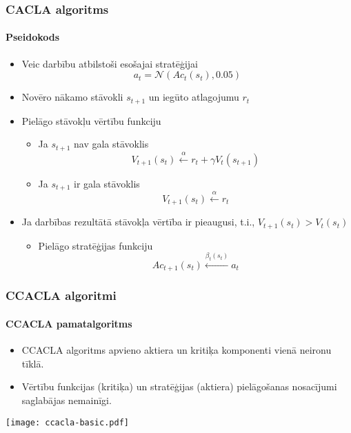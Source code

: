 \documentclass[xetex,mathserif]{beamer}
\begin{document}
  \begin{frame}
    \frametitle{CACLA algoritms}
    \framesubtitle{Pseidokods}
    \begin{itemize}
      \item Veic darbību atbilstoši esošajai stratēģijai
        \begin{equation*}
          a_t = \mathcal{N}\left(Ac_t(s_t), 0.05\right)
        \end{equation*}
      \item Novēro nākamo stāvokli $s_{t+1}$ un iegūto atlagojumu $r_{t}$
      \item Pielāgo stāvokļu vērtību funkciju
        \begin{itemize}
          \item Ja $s_{t+1}$ nav gala stāvoklis
            \begin{equation*}
              V_{t+1}(s_t) \xleftarrow{\alpha} r_t + \gamma V_t(s_{t + 1})
            \end{equation*}
          \item Ja $s_{t+1}$ ir gala stāvoklis
            \begin{equation*}
              V_{t+1}(s_t) \xleftarrow{\alpha} r_t
            \end{equation*}
        \end{itemize}
      \item Ja darbības rezultātā stāvokļa vērtība ir pieaugusi, t.i., $V_{t+1}(s_t)
        > V_t(s_t)$
        \begin{itemize}
          \item Pielāgo stratēģijas funkciju
            \begin{equation*}
              Ac_{t+1}(s_t) \xleftarrow{\beta_t(s_t)} a_t
            \end{equation*}
        \end{itemize}
    \end{itemize}
  \end{frame}

  \begin{frame}
    \frametitle{CCACLA algoritmi}
    \framesubtitle{CCACLA pamatalgoritms}
    \begin{itemize}
      \item CCACLA algoritms apvieno aktiera un kritiķa komponenti vienā neironu
        tīklā.
      \item Vērtību funkcijas (kritiķa) un stratēģijas (aktiera) pielāgošanas
        nosacījumi saglabājas nemainīgi.
    \end{itemize}
    \begin{center}
      \hspace{2cm} \texttt{[image: ccacla-basic.pdf]}
    \end{center}
  \end{frame}
\end{document}
